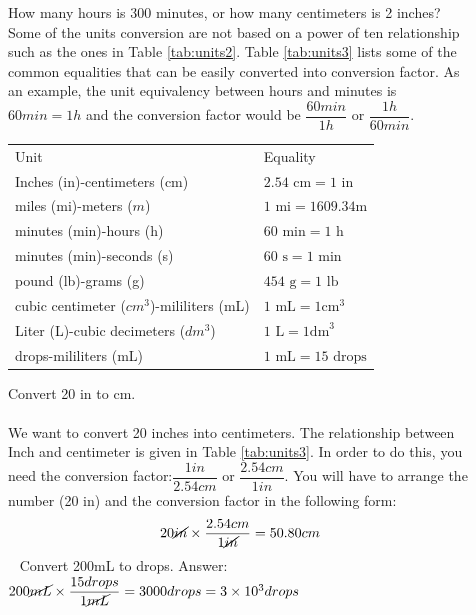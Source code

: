 \documentclass[main.tex]{subfiles}
\begin{document}
\begin{description}
\item[] How many hours is 300 minutes, or how many centimeters is 2 inches? Some of the units conversion are not based on a power of ten relationship such as the ones in Table \ref{tab:units2}. Table \ref{tab:units3} lists some of the common equalities that can be easily converted into conversion factor. As an example, the unit equivalency between hours and minutes is $60min=1h$ and the conversion factor would be $\dfrac{60min}{1h}$ or $\dfrac{1h}{60min}$.
 \label{tab:units3}
\begin{center}
\selectfont
\begin{tabular}{ll}
\rowcolor{black!45}
\toprule
\multicolumn{2}{l}{\hypersetup{colorlinks,linkcolor={white}} \cellcolor{black}\color{white}\bfseries\small Table \ref{tab:units3} Table containing some common unit equalities } \\
\midrule
Unit & Equality \\
\midrule
Inches (in)-centimeters (cm)  &$2.54\text{ cm}=1\text{ in}$  \\
miles (mi)-meters ($m$)  &$1\text{ mi}=1609.34$m  \\
minutes (min)-hours (h)  &$60\text{ min}=1\text{ h}$  \\
minutes (min)-seconds (s)  &$60\text{ s}=1\text{ min}$  \\
pound (lb)-grams (g)  &$454\text{ g}=1\text{ lb}$  \\
cubic centimeter ($cm^3$)-mililiters (mL)  &$1\text{ mL}=1\text{cm}^3$  \\
Liter (L)-cubic decimeters ($dm^3$)  &$1\text{ L}=1\text{dm}^3$  \\
drops-mililiters (mL)  &$1\text{ mL}=15\text{ drops}$  \\
\bottomrule
\end{tabular}
\end{center}


\begin{example} %
Convert 20 in to cm.\\
\\
 We want to convert 20 inches into centimeters. The relationship between Inch and centimeter is given in Table \ref{tab:units3}. In order to do this, you need the conversion factor:$\dfrac{1in}{2.54cm}$ or $\dfrac{2.54cm}{1in}$. You will have to arrange the number (20 in) and the conversion factor in the following form:
 \begin{equation*}
20\cancel{in} \times \dfrac{2.54cm}{1\cancel{in}}=50.80cm
\end{equation*}
\faDiamond\ 
Convert 200mL to drops.
\flushright Answer: $200\cancel{mL} \times \dfrac{15 drops}{1\cancel{mL}}=3000drops=3\times 10^3drops$
\end{example}%

\end{description}
\end{document}
